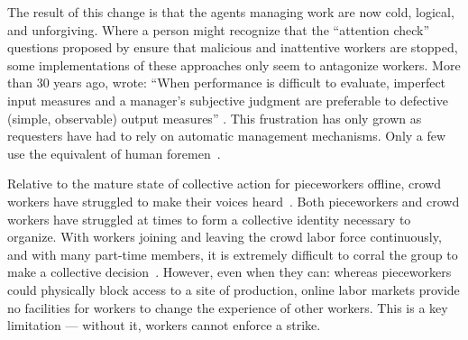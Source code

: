 \documentclass[trackingWork]{subfiles}
\begin{document}

The result of this change is that the agents managing work are now
cold, logical, and unforgiving.
Where a person might recognize that the ``attention check'' questions 
proposed by \citeauthor{le2010ensuring} ensure that malicious and inattentive workers are stopped,
some implementations of these approaches
only seem to antagonize workers.
More than 30 years ago, \citeauthor{10.2307/2555446} wrote:
``When performance is difficult to evaluate,
imperfect input measures and
a manager's subjective judgment are preferable to
defective (simple, observable) output measures''
\cite{10.2307/2555446}.
This frustration has only grown as requesters have had to rely on automatic management mechanisms. Only a few use the equivalent of human foremen~\cite{haas2015argonaut,kulkarni2012mobileworks}.


Relative to the mature state of collective action for pieceworkers offline, crowd workers have struggled to make their voices heard~\cite{dynamo,storiesIraniSilberman,turkopticon}.
Both pieceworkers and crowd workers have struggled at times to form a collective identity necessary to organize.
With workers joining and leaving the crowd labor force continuously, and with many part-time members, it is extremely difficult to corral the group to make a collective decision~\cite{dynamo}.
However, even when they can: whereas pieceworkers could physically block access to a site of production, online labor markets provide no facilities for workers to change the experience of other workers.
This is a key limitation --- without it, workers cannot enforce a strike.
\end{document}
